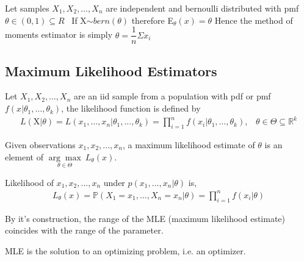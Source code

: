 \par Let samples $X_1,X_2,\dots,X_n$ are independent and bernoulli distributed with pmf $\theta \in (0,1)\subseteq R$
\ If X$\sim bern(\theta)$ therefore E$_\theta(x)=\theta$
Hence the method of moments estimator is simply 
$\theta = \dfrac{1}{n} \Sigma x_i$
\subsection{Maximum Likelihood Estimators}
Let $X_1,X_2,\dots,X_n$ are an iid sample from a population with pdf or pmf $f(x|\theta_1,\dots,\theta_k)$, the likelihood function is defined by
\begin{align}
L(\mathrm{X}|\theta)=L(x_1,\dots,x_n|\theta_1,...,\theta_k)=\prod\limits_{i=1}^n f(x_i|\theta_1,\dots,\theta_k),\,\,\,\,\,\theta \in \Theta\subseteq\mathbb{R}^k
\end{align} 
\begin{defn}{Given observations $x_1,x_2,...,x_n$, a maximum likelihood estimate of $\theta$ is an element of $\underset{\theta \in \Theta}{\arg\max} ~L_{\theta}(x)$.}
\par Likelihood of $x_1,x_2,...,x_n$ under $p(x_1,...,x_n|\theta)$ is,
\begin{align}
L_{\theta}(x) = \mathbb{P}(X_1=x_1,\dots,X_n=x_n|\theta)=\prod\limits_{i=1}^n f(x_i|\theta)
\end{align} 
\end{defn}
\begin{rem}
By it's construction, the range of the MLE (maximum likelihood estimate) coincides with the range of the parameter.
\end{rem}
\begin{rem}
MLE is the solution to an optimizing problem, i.e. an optimizer. 
\end{rem}
